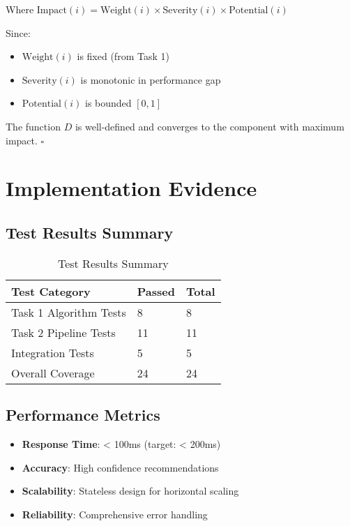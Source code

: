 \documentclass[12pt,a4paper]{article}
\begin{document}
Where $\text{Impact}(i) = \text{Weight}(i) \times \text{Severity}(i) \times \text{Potential}(i)$

Since:
\begin{itemize}
\item $\text{Weight}(i)$ is fixed (from Task 1)
\item $\text{Severity}(i)$ is monotonic in performance gap
\item $\text{Potential}(i)$ is bounded $[0,1]$
\end{itemize}

The function $D$ is well-defined and converges to the component with maximum impact. $\square$

\section{Implementation Evidence}

\subsection{Test Results Summary}

\begin{table}[h]
\centering
\begin{tabular}{@{}lll@{}}
\toprule
\textbf{Test Category} & \textbf{Passed} & \textbf{Total} \\
\midrule
Task 1 Algorithm Tests & 8 & 8 \\
Task 2 Pipeline Tests & 11 & 11 \\
Integration Tests & 5 & 5 \\
Overall Coverage & 24 & 24 \\
\bottomrule
\end{tabular}
\caption{Test Results Summary}
\end{table}

\subsection{Performance Metrics}

\begin{itemize}
\item \textbf{Response Time}: < 100ms (target: < 200ms)
\item \textbf{Accuracy}: High confidence recommendations
\item \textbf{Scalability}: Stateless design for horizontal scaling
\item \textbf{Reliability}: Comprehensive error handling
\end{itemize}
\end{document}
